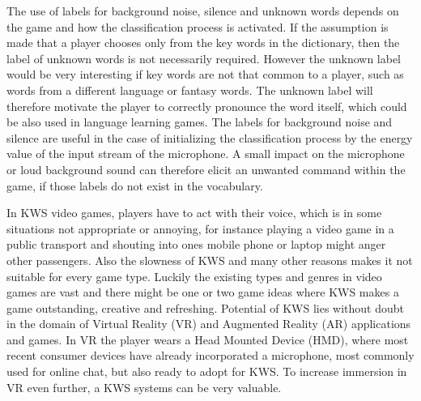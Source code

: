 The use of labels for background noise, silence and unknown words depends on the game and how the classification process is activated.
If the assumption is made that a player chooses only from the key words in the dictionary, then the label of unknown words is not necessarily required.
However the unknown label would be very interesting if key words are not that common to a player, such as words from a different language or fantasy words.
The unknown label will therefore motivate the player to correctly pronounce the word itself, which could be also used in language learning games.
The labels for background noise and silence are useful in the case of initializing the classification process by the energy value of the input stream of the microphone.
A small impact on the microphone or loud background sound can therefore elicit an unwanted command within the game, if those labels do not exist in the vocabulary.

In KWS video games, players have to act with their voice, which is in some situations not appropriate or annoying, for instance playing a video game in a public transport and shouting into ones mobile phone or laptop might anger other passengers.
Also the slowness of KWS and many other reasons makes it not suitable for every game type.
Luckily the existing types and genres in video games are vast and there might be one or two game ideas where KWS makes a game outstanding, creative and refreshing.
Potential of KWS lies without doubt in the domain of Virtual Reality (VR) and Augmented Reality (AR) applications and games.
In VR the player wears a Head Mounted Device (HMD), where most recent consumer devices have already incorporated a microphone, most commonly used for online chat, but also ready to adopt for KWS.
To increase immersion in VR even further, a KWS systems can be very valuable.